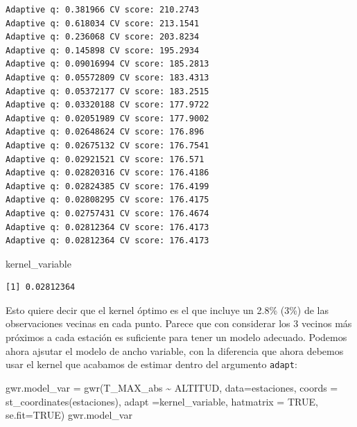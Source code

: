 \documentclass[
  letterpaper,
  DIV=11,
  numbers=noendperiod]{scrreprt}
\newenvironment{Shaded}{\begin{snugshade}}{\end{snugshade}}
\newcommand{\AttributeTok}[1]{\textcolor[rgb]{0.40,0.45,0.13}{#1}}
\newcommand{\ConstantTok}[1]{\textcolor[rgb]{0.56,0.35,0.01}{#1}}
\newcommand{\FunctionTok}[1]{\textcolor[rgb]{0.28,0.35,0.67}{#1}}
\newcommand{\NormalTok}[1]{\textcolor[rgb]{0.00,0.23,0.31}{#1}}
\newcommand{\OtherTok}[1]{\textcolor[rgb]{0.00,0.23,0.31}{#1}}
\newcommand{\SpecialCharTok}[1]{\textcolor[rgb]{0.37,0.37,0.37}{#1}}
\begin{document}
\begin{verbatim}
Adaptive q: 0.381966 CV score: 210.2743 
Adaptive q: 0.618034 CV score: 213.1541 
Adaptive q: 0.236068 CV score: 203.8234 
Adaptive q: 0.145898 CV score: 195.2934 
Adaptive q: 0.09016994 CV score: 185.2813 
Adaptive q: 0.05572809 CV score: 183.4313 
Adaptive q: 0.05372177 CV score: 183.2515 
Adaptive q: 0.03320188 CV score: 177.9722 
Adaptive q: 0.02051989 CV score: 177.9002 
Adaptive q: 0.02648624 CV score: 176.896 
Adaptive q: 0.02675132 CV score: 176.7541 
Adaptive q: 0.02921521 CV score: 176.571 
Adaptive q: 0.02820316 CV score: 176.4186 
Adaptive q: 0.02824385 CV score: 176.4199 
Adaptive q: 0.02808295 CV score: 176.4175 
Adaptive q: 0.02757431 CV score: 176.4674 
Adaptive q: 0.02812364 CV score: 176.4173 
Adaptive q: 0.02812364 CV score: 176.4173 
\end{verbatim}

\begin{Shaded}
\begin{Highlighting}[]
\NormalTok{kernel\_variable}
\end{Highlighting}
\end{Shaded}

\begin{verbatim}
[1] 0.02812364
\end{verbatim}

Esto quiere decir que el kernel óptimo es el que incluye un 2.8\% (3\%)
de las observaciones vecinas en cada punto. Parece que con considerar
los 3 vecinos más próximos a cada estación es suficiente para tener un
modelo adecuado. Podemos ahora ajsutar el modelo de ancho variable, con
la diferencia que ahora debemos usar el kernel que acabamos de estimar
dentro del argumento \texttt{adapt}:

\begin{Shaded}
\begin{Highlighting}[]
\NormalTok{gwr.model\_var }\OtherTok{=} \FunctionTok{gwr}\NormalTok{(T\_MAX\_abs }\SpecialCharTok{\textasciitilde{}}\NormalTok{ ALTITUD, }\AttributeTok{data=}\NormalTok{estaciones, }\AttributeTok{coords =} \FunctionTok{st\_coordinates}\NormalTok{(estaciones), }
                    \AttributeTok{adapt =}\NormalTok{kernel\_variable, }
                    \AttributeTok{hatmatrix =} \ConstantTok{TRUE}\NormalTok{, }\AttributeTok{se.fit=}\ConstantTok{TRUE}\NormalTok{) }
\NormalTok{gwr.model\_var}
\end{Highlighting}
\end{Shaded}
\end{document}
